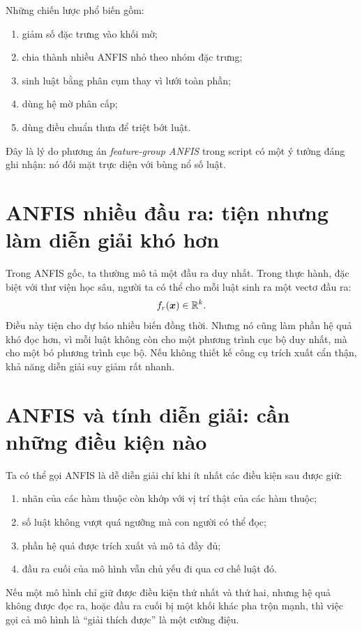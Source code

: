 Những chiến lược phổ biến gồm:

\begin{enumerate}
\item giảm số đặc trưng vào khối mờ;
\item chia thành nhiều ANFIS nhỏ theo nhóm đặc trưng;
\item sinh luật bằng phân cụm thay vì lưới toàn phần;
\item dùng hệ mờ phân cấp;
\item dùng điều chuẩn thưa để triệt bớt luật.
\end{enumerate}

Đây là lý do phương án \emph{feature-group ANFIS} trong script có một ý tưởng đáng ghi nhận: nó đối mặt trực diện với bùng nổ số luật.

\section{ANFIS nhiều đầu ra: tiện nhưng làm diễn giải khó hơn}

Trong ANFIS gốc, ta thường mô tả một đầu ra duy nhất. Trong thực hành, đặc biệt với thư viện học sâu, người ta có thể cho mỗi luật sinh ra một vectơ đầu ra:
\[
f_r(\bm{x})\in\mathbb{R}^k.
\]
Điều này tiện cho dự báo nhiều biến đồng thời. Nhưng nó cũng làm phần hệ quả khó đọc hơn, vì mỗi luật không còn cho một phương trình cục bộ duy nhất, mà cho một bó phương trình cục bộ. Nếu không thiết kế công cụ trích xuất cẩn thận, khả năng diễn giải suy giảm rất nhanh.

\section{ANFIS và tính diễn giải: cần những điều kiện nào}

Ta có thể gọi ANFIS là dễ diễn giải chỉ khi ít nhất các điều kiện sau được giữ:

\begin{enumerate}
\item nhãn của các hàm thuộc còn khớp với vị trí thật của các hàm thuộc;
\item số luật không vượt quá ngưỡng mà con người có thể đọc;
\item phần hệ quả được trích xuất và mô tả đầy đủ;
\item đầu ra cuối của mô hình vẫn chủ yếu đi qua cơ chế luật đó.
\end{enumerate}

Nếu một mô hình chỉ giữ được điều kiện thứ nhất và thứ hai, nhưng hệ quả không được đọc ra, hoặc đầu ra cuối bị một khối khác pha trộn mạnh, thì việc gọi cả mô hình là ``giải thích được'' là một cường điệu.

